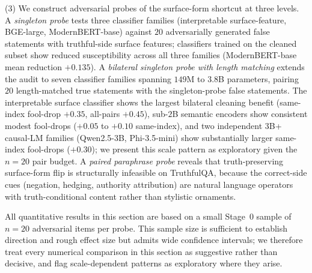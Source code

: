 
(3) We construct adversarial probes of the surface-form shortcut at
three levels. A \emph{singleton probe} tests three classifier
families (interpretable surface-feature, BGE-large, ModernBERT-base)
against $20$ adversarially generated false statements with
truthful-side surface features; classifiers trained on the cleaned
subset show reduced susceptibility across all three families
(ModernBERT-base mean reduction $+0.135$). A \emph{bilateral
singleton probe with length matching} extends the audit to seven
classifier families spanning $149$M to $3.8$B parameters, pairing
$20$ length-matched true statements with the singleton-probe false
statements. The interpretable surface classifier shows the largest
bilateral cleaning benefit (same-index fool-drop $+0.35$, all-pairs
$+0.45$), sub-$2$B semantic encoders show consistent modest
fool-drops ($+0.05$ to $+0.10$ same-index), and two independent
$3$B+ causal-LM families (Qwen2.5-3B, Phi-3.5-mini) show
substantially larger same-index fool-drops ($+0.30$); we present
this scale pattern as exploratory given the $n=20$ pair budget. A
\emph{paired paraphrase probe} reveals that truth-preserving
surface-form flip is structurally infeasible on TruthfulQA, because
the correct-side cues (negation, hedging, authority attribution) are
natural language operators with truth-conditional content rather
than stylistic ornaments.



All quantitative results in this section are based on a small Stage~0
sample of $n=20$ adversarial items per probe. This sample size is
sufficient to establish direction and rough effect size but admits
wide confidence intervals; we therefore treat every numerical
comparison in this section as suggestive rather than decisive, and
flag scale-dependent patterns as exploratory where they arise.


